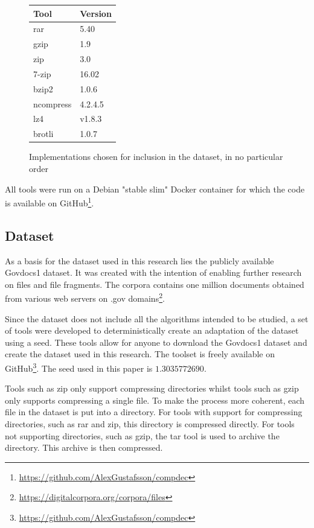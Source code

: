 \documentclass[conference]{IEEEtran}
\begin{document}
\begin{figure}[H]
    \centering
    \begin{tabular}{l|l}
        Tool & Version\\
        \hline
        rar & 5.40 \\
        gzip & 1.9 \\
        zip & 3.0 \\
        7-zip & 16.02 \\
        bzip2 & 1.0.6 \\
        ncompress & 4.2.4.5 \\
        lz4 & v1.8.3 \\
        brotli & 1.0.7
    \end{tabular}
    \caption{Implementations chosen for inclusion in the dataset, in no particular order}
    \label{fig:method:algorithms2}
\end{figure}

All tools were run on a Debian "stable slim" Docker container for which the code is available on GitHub\footnote{\href{https://github.com/AlexGustafsson/compdec}{https://github.com/AlexGustafsson/compdec}}.

\subsection{Dataset}
\label{method:dataset}

As a basis for the dataset used in this research lies the publicly available Govdocs1 dataset. It was created with the intention of enabling further research on files and file fragments. The corpora contains one million documents obtained from various web servers on .gov domains\footnote{\href{https://digitalcorpora.org/corpora/files}{https://digitalcorpora.org/corpora/files}}.

Since the dataset does not include all the algorithms intended to be studied, a set of tools were developed to deterministically create an adaptation of the dataset using a seed. These tools allow for anyone to download the Govdocs1 dataset and create the dataset used in this research. The toolset is freely available on GitHub\footnote{\href{https://github.com/AlexGustafsson/compdec}{https://github.com/AlexGustafsson/compdec}}. The seed used in this paper is $1.3035772690$.

Tools such as zip only support compressing directories whilst tools such as gzip only supports compressing a single file. To make the process more coherent, each file in the dataset is put into a directory. For tools with support for compressing directories, such as rar and zip, this directory is compressed directly. For tools not supporting directories, such as gzip, the tar tool is used to archive the directory. This archive is then compressed.
\end{document}
